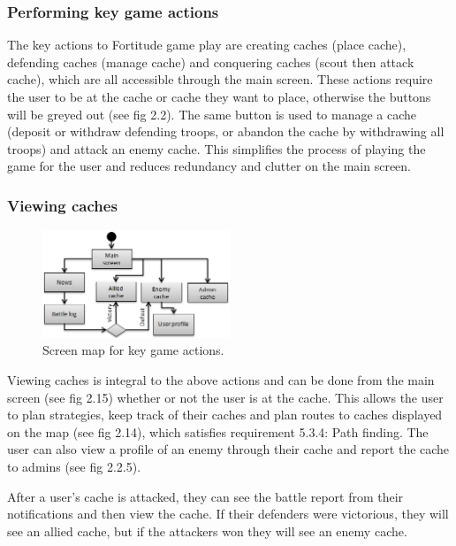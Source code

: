 \newpage
\subsubsection{Performing key game actions}

The key actions to Fortitude game play are creating caches (place cache), defending caches (manage cache) and conquering caches (scout then attack cache), which are all accessible through the main screen. These actions require the user to be at the cache or cache they want to place, otherwise the buttons will be greyed out (see fig 2.2). The same button is used to manage a cache (deposit or withdraw defending troops, or abandon the cache by withdrawing all troops) and attack an enemy cache. This simplifies the process of playing the game for the user and reduces redundancy and clutter on the main screen.

\subsubsection{Viewing caches}

\begin{figure}
	\vspace{-20pt}
	\begin{center}
	\includegraphics[width=0.5\textwidth]{images/viewing_caches}
	\caption{Screen map for key game actions.}
	\label{viewing_caches}
	\vspace{-20pt}
	\end{center}
\end{figure}

Viewing caches is integral to the above actions and can be done from the main screen (see fig 2.15) whether or not the user is at the cache. This allows the user to plan strategies, keep track of their caches and plan routes to caches displayed on the map (see fig 2.14), which satisfies requirement 5.3.4: Path finding. The user can also view a profile of an enemy through their cache and report the cache to admins (see fig 2.2.5).

After a user's cache is attacked, they can see the battle report from their notifications and then view the cache. If their defenders were victorious, they will see an allied cache, but if the attackers won they will see an enemy cache.

